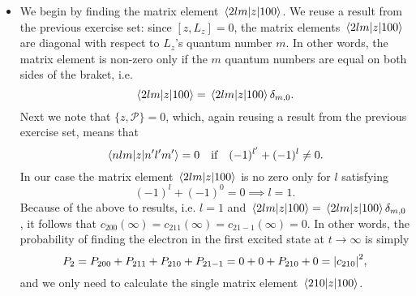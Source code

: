 \documentclass[11pt, a4paper]{article}
\renewcommand{\P}{\mathcal{P}}  %
\begin{document}
\begin{itemize}
	\item We begin by finding the matrix element $ \mel{2lm}{z}{100} $. We reuse a result from the previous exercise set: since $ [z, L_{z}] = 0 $, the matrix elements $ \mel{2lm}{z}{100} $ are diagonal with respect to $ L_{z} $'s quantum number $ m $. In other words, the matrix element is non-zero only if the $ m $ quantum numbers are equal on both sides of the braket, i.e.
	\begin{equation*}
		\mel{2lm}{z}{100} = \mel{2lm}{z}{100}\delta_{m, 0}.
	\end{equation*}
	Next we note that $ \{z, \P \} = 0 $, which, again reusing a result from the previous exercise set, means that
	\begin{equation*}
		\mel{nlm}{z}{n'l'm'} = 0 \quad \text{if} \quad (-1)^{l'} + (-1)^{l} \neq 0 .
	\end{equation*}
	In our case the matrix element $ \mel{2lm}{z}{100} $ is no zero only for $ l $ satisfying
	\begin{equation*}
		(-1)^{l} + (-1)^{0} = 0  \implies l = 1.
	\end{equation*}
	Because of the above to results, i.e. $ l = 1 $ and $ \mel{2lm}{z}{100} = \mel{2lm}{z}{100}\delta_{m, 0} $, it follows that $ c_{200}(\infty) = c_{211}(\infty) = c_{21-1}(\infty) = 0 $. In other words, the probability of finding the electron in the first excited state at $ t \to \infty $ is simply
	\begin{equation*}
		P_{2} = P_{200} + P_{211} + P_{210} + P_{21-1} = 0 + 0 + P_{210} + 0 = \abs{c_{210}}^{2},
	\end{equation*}
	and we only need to calculate the single matrix element $ \mel{210}{z}{100} $.
	

\end{itemize}
\end{document}
